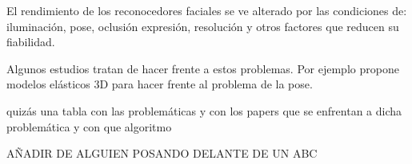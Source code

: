 El rendimiento de los reconocedores faciales se ve alterado por las condiciones de: iluminación, pose, oclusión expresión, resolución y otros factores que reducen su fiabilidad.

Algunos estudios tratan de hacer frente a estos problemas. Por ejemplo \cite{abiantun2014sparse} propone modelos elásticos 3D para hacer frente al problema de la pose.

\color{red} quizás una tabla con las problemáticas y con los papers que se enfrentan a dicha problemática y con que algoritmo \color{black}

\color{red} AÑADIR DE ALGUIEN POSANDO DELANTE DE UN ABC \color{black}





